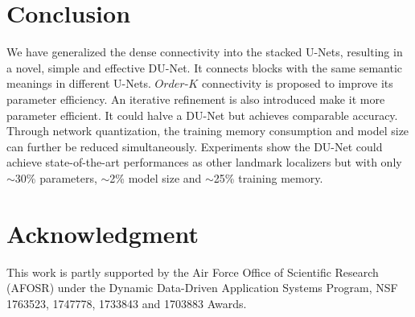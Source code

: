 \documentclass[runningheads]{llncs}
\begin{document}
 \section{Conclusion}
We have generalized the dense connectivity into the stacked U-Nets, resulting in a novel, simple and effective DU-Net. It connects blocks with the same semantic meanings in different U-Nets. $Order$-$K$ connectivity is proposed to improve its parameter efficiency. An iterative refinement is also introduced make it more parameter efficient. It could halve a DU-Net but achieves comparable accuracy.
Through network quantization, the training memory consumption and model size can further be reduced simultaneously.
Experiments show the DU-Net could achieve state-of-the-art performances as other landmark localizers but with only  $\sim$30\% parameters, $\sim$2\% model size and $\sim$25\% training memory. \section{Acknowledgment}
This work is partly supported by the Air Force Office of Scientific Research (AFOSR) under the Dynamic Data-Driven Application Systems Program, NSF 1763523, 1747778, 1733843 and 1703883 Awards. 
\clearpage



\end{document}
